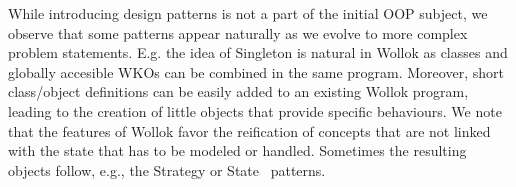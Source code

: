While introducing design patterns is not a part of the initial OOP subject, we observe that some patterns appear naturally as we evolve to more complex problem statements. E.g. the idea of Singleton is natural in  Wollok as classes and globally accesible WKOs can be combined in the same program. Moreover, short class/object definitions can be easily added to an existing Wollok program, leading to the creation of little objects that provide specific behaviours. We note that the features of Wollok favor the reification of concepts that are not linked with the state that has to be modeled or handled. Sometimes the resulting objects follow, e.g., the Strategy or State~\cite{Gamm93b} patterns.

